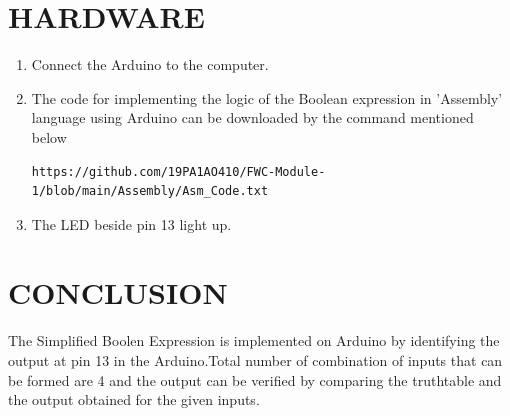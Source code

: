 \documentclass[10pt, a4paper]{article}
\begin{document}
\section{HARDWARE}
\begin{enumerate}
\item Connect the Arduino to the computer.
\item The code for implementing the logic of the Boolean expression in 'Assembly' language using Arduino can be downloaded by the command mentioned below\\
\begin{lstlisting}
https://github.com/19PA1AO410/FWC-Module-1/blob/main/Assembly/Asm_Code.txt
\end{lstlisting}
\item The LED beside pin 13 light up.
\end{enumerate}
\section{CONCLUSION}
The Simplified Boolen Expression is implemented on Arduino by identifying the output at pin 13 in the Arduino.Total number of combination of inputs that can be formed are 4 and the output can be verified by comparing the truthtable and the output obtained for the given inputs.


\end{document}
